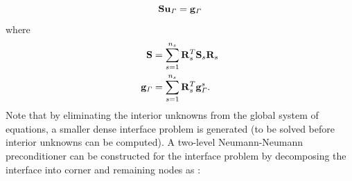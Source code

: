 \documentclass{article}
\begin{document}
\begin{equation}
\mathbf{S} \mathbf{u}_{\it{\Gamma}} = \mathbf{g}_{\it{\Gamma}}
\end{equation}
where
\begin{align}
\mathbf{S} &= \sum_{s=1}^{n_s}  \mathbf{R}^T_s \mathbf{S}_s \mathbf{R}_s \\
\mathbf{g}_{\it{\Gamma}} &= \sum_{s=1}^{n_s} \mathbf{R}^T_s  \mathbf{g}_{\it{\Gamma}}^s.
\end{align}
Note that by eliminating the interior unknowns from the global system of equations, a smaller dense interface problem is generated (to be solved before interior unknowns can be computed). A two-level Neumann-Neumann preconditioner can be constructed for the interface problem by decomposing the interface into corner and remaining nodes as \cite{subber_thesis}:
\end{document}
